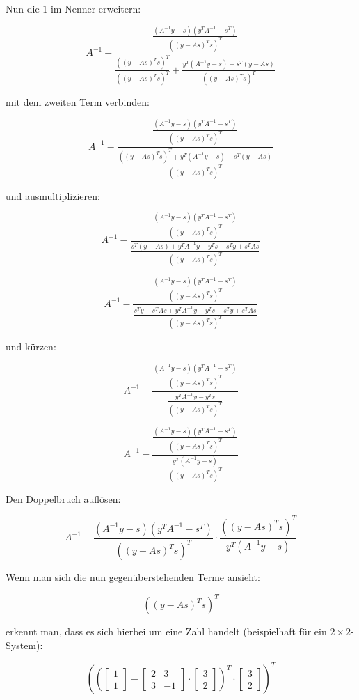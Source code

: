 \documentclass[a4paper, 12pt]{report}
\begin{document}
Nun die $1$ im Nenner erweitern:

$$ A^{-1} - \frac{ \frac{ (A^{-1}y-s)(y^TA^{-1}-s^T) }{\left( (y-As)^Ts\right)^T } }{ \frac{\left( (y-As)^Ts\right)^T}{\left( (y-As)^Ts\right)^T} + \frac{ y^T(A^{-1}y - s) - s^T(y - As) }{\left( (y-As)^Ts\right)^T}}$$

mit dem zweiten Term verbinden:

$$ A^{-1} - \frac{ \frac{ (A^{-1}y-s)(y^TA^{-1}-s^T) }{\left( (y-As)^Ts\right)^T } }{ \frac{ \left( (y-As)^Ts\right)^T + y^T(A^{-1}y - s) - s^T(y - As) }{\left( (y-As)^Ts\right)^T}}$$

und ausmultiplizieren:

$$ A^{-1} - \frac{ \frac{ (A^{-1}y-s)(y^TA^{-1}-s^T) }{\left( (y-As)^Ts\right)^T } }{ \frac{ s^T(y - As) + y^TA^{-1}y - y^Ts - s^Ty + s^TAs }{\left( (y-As)^Ts\right)^T}}$$

$$ A^{-1} - \frac{ \frac{ (A^{-1}y-s)(y^TA^{-1}-s^T) }{\left( (y-As)^Ts\right)^T } }{ \frac{ s^Ty - s^TAs + y^TA^{-1}y - y^Ts - s^Ty + s^TAs }{\left( (y-As)^Ts\right)^T}}$$

und kürzen:

$$ A^{-1} - \frac{ \frac{ (A^{-1}y-s)(y^TA^{-1}-s^T) }{\left( (y-As)^Ts\right)^T } }{ \frac{ y^TA^{-1}y - y^Ts }{\left( (y-As)^Ts\right)^T}}$$

$$ A^{-1} - \frac{ \frac{ (A^{-1}y-s)(y^TA^{-1}-s^T) }{\left( (y-As)^Ts\right)^T } }{ \frac{ y^T(A^{-1}y - s) }{\left( (y-As)^Ts\right)^T}}$$

Den Doppelbruch auflösen:

$$ A^{-1} - \frac{ (A^{-1}y-s)(y^TA^{-1}-s^T) }{\left( (y-As)^Ts\right)^T } \cdot \frac{ \left( (y-As)^Ts\right)^T }{ y^T(A^{-1}y - s) }$$

Wenn man sich die nun gegenüberstehenden Terme ansieht:

$$\left( (y-As)^Ts\right)^T$$

erkennt man, dass es sich hierbei um eine Zahl handelt (beispielhaft für ein $2\times 2$-System):

$$\left( \left(\begin{bmatrix}1\\1\end{bmatrix} - \begin{bmatrix}2 & 3\\3 & -1\end{bmatrix}\cdot \begin{bmatrix}3\\2\end{bmatrix} \right)^T\cdot \begin{bmatrix}3\\2\end{bmatrix} \right)^T$$
\end{document}
